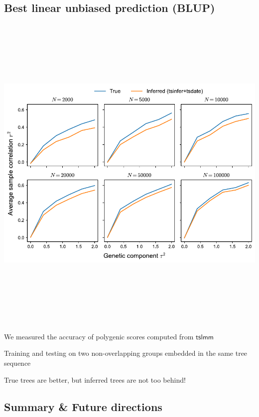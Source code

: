 \documentclass[
  letterpaper,
  DIV=11,
  numbers=noendperiod]{scrartcl}
\begin{document}
\subsection{Best linear unbiased prediction
(BLUP)}\label{best-linear-unbiased-prediction-blup}

\begin{center}
\includegraphics[width=\linewidth,height=6.25in,keepaspectratio]{slides_files/mediabag/imgs/prediction.pdf}
\end{center}

We measured the accuracy of polygenic scores computed from
\(\textsf{tslmm}\)

Training and testing on two non-overlapping groups embedded in the same
tree sequence

True trees are better, but inferred trees are not too behind!

\subsection{Summary \& Future
directions}\label{summary-future-directions}
\end{document}
